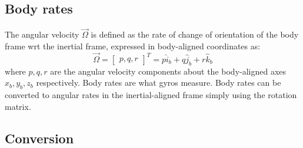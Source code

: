 \subsection{Body rates}
The angular velocity \( \vec{\Omega} \) is defined as the rate of change of orientation of the body frame wrt the inertial frame, expressed in body-aligned coordinates as:
\begin{equation} \nonumber
    \vec{\Omega} = \begin{bmatrix}
        p, q, r
    \end{bmatrix}^T = p \hat{i}_b + q \hat{j}_b + r \hat{k}_b
\end{equation}
where \( p, q, r \) are the angular velocity components about the body-aligned axes \( x_b, y_b, z_b \) respectively. Body rates are what gyros measure.
Body rates can be converted to angular rates in the inertial-aligned frame simply using the rotation matrix.

\subsection{Conversion}
